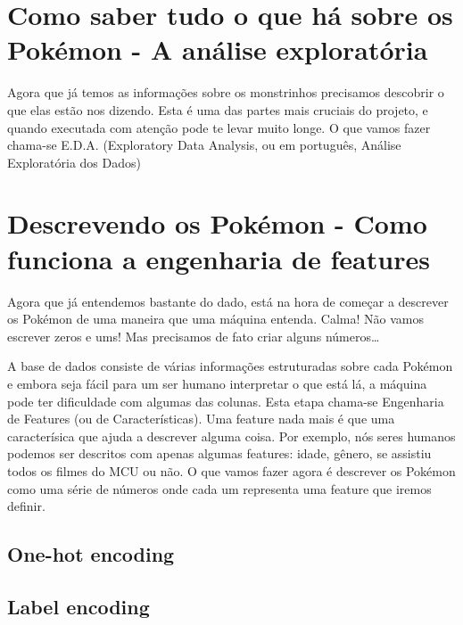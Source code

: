 \documentclass[]{book}
\begin{document}
\hypertarget{como-saber-tudo-o-que-huxe1-sobre-os-pokuxe9mon---a-anuxe1lise-exploratuxf3ria}{%
\chapter{Como saber tudo o que há sobre os Pokémon - A análise exploratória}\label{como-saber-tudo-o-que-huxe1-sobre-os-pokuxe9mon---a-anuxe1lise-exploratuxf3ria}}

Agora que já temos as informações sobre os monstrinhos precisamos descobrir o que elas estão nos dizendo. Esta é uma das partes mais cruciais do projeto, e quando executada com atenção pode te levar muito longe. O que vamos fazer chama-se E.D.A. (Exploratory Data Analysis, ou em português, Análise Exploratória dos Dados)

\hypertarget{descrevendo-os-pokuxe9mon---como-funciona-a-engenharia-de-features}{%
\chapter{Descrevendo os Pokémon - Como funciona a engenharia de features}\label{descrevendo-os-pokuxe9mon---como-funciona-a-engenharia-de-features}}

Agora que já entendemos bastante do dado, está na hora de começar a descrever os Pokémon de uma maneira que uma máquina entenda. Calma! Não vamos escrever zeros e ums! Mas precisamos de fato criar alguns números\ldots{}

A base de dados consiste de várias informações estruturadas sobre cada Pokémon e embora seja fácil para um ser humano interpretar o que está lá, a máquina pode ter dificuldade com algumas das colunas. Esta etapa chama-se Engenharia de Features (ou de Características). Uma feature nada mais é que uma caracterísica que ajuda a descrever alguma coisa. Por exemplo, nós seres humanos podemos ser descritos com apenas algumas features: idade, gênero, se assistiu todos os filmes do MCU ou não. O que vamos fazer agora é descrever os Pokémon como uma série de números onde cada um representa uma feature que iremos definir.

\hypertarget{one-hot-encoding}{%
\section{One-hot encoding}\label{one-hot-encoding}}

\hypertarget{label-encoding}{%
\section{Label encoding}\label{label-encoding}}
\end{document}
